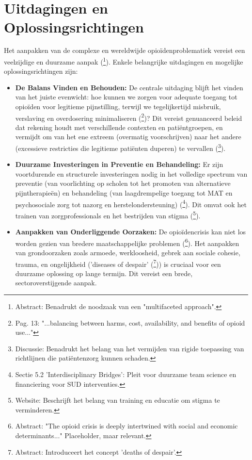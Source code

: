 \documentclass[11pt, a4paper]{report} %
\begin{document}
\section{Uitdagingen en Oplossingsrichtingen}
Het aanpakken van de complexe en wereldwijde opioïdenproblematiek vereist een veelzijdige en duurzame aanpak (\cite{Volkow2021ChangingOpioidCrisis}\footnote{Abstract: Benadrukt de noodzaak van een "multifaceted approach".}). Enkele belangrijke uitdagingen en mogelijke oplossingsrichtingen zijn:
\begin{itemize}
    \item \textbf{De Balans Vinden en Behouden:} De centrale uitdaging blijft het vinden van het juiste evenwicht: hoe kunnen we zorgen voor adequate toegang tot opioïden voor legitieme pijnstilling, terwijl we tegelijkertijd misbruik, verslaving en overdosering minimaliseren (\cite{Maclean2020EconomicStudiesOpioid}\footnote{Pag. 13: "...balancing between harms, cost, availability, and benefits of opioid use..."})? Dit vereist genuanceerd beleid dat rekening houdt met verschillende contexten en patiëntgroepen, en vermijdt om van het ene extreem (overmatig voorschrijven) naar het andere (excessieve restricties die legitieme patiënten duperen) te vervallen (\cite{Dowell2016CDCGuideline}\footnote{Discussie: Benadrukt het belang van het vermijden van rigide toepassing van richtlijnen die patiëntenzorg kunnen schaden.}).
    \item \textbf{Duurzame Investeringen in Preventie en Behandeling:} Er zijn voortdurende en structurele investeringen nodig in het volledige spectrum van preventie (van voorlichting op scholen tot het promoten van alternatieve pijntherapieën) en behandeling (van laagdrempelige toegang tot MAT en psychosociale zorg tot nazorg en herstelondersteuning) (\cite{Yarosh2020ComputationalSupportSUD}\footnote{Sectie 5.2 'Interdisciplinary Bridges': Pleit voor duurzame team science en financiering voor SUD interventies.}). Dit omvat ook het trainen van zorgprofessionals en het bestrijden van stigma (\cite{CDCStigmaReduction}\footnote{Website: Beschrijft het belang van training en educatie om stigma te verminderen.}).
    \item \textbf{Aanpakken van Onderliggende Oorzaken:} De opioïdencrisis kan niet los worden gezien van bredere maatschappelijke problemen (\cite{Dasgupta2018OpioidCrisisSocialEconomicDeterminants}\footnote{Abstract: "The opioid crisis is deeply intertwined with social and economic determinants..." Placeholder, maar relevant.}). Het aanpakken van grondoorzaken zoals armoede, werkloosheid, gebrek aan sociale cohesie, trauma, en ongelijkheid ('diseases of despair' (\cite{CaseDeaton2015RisingMorbidityMortality}\footnote{Abstract: Introduceert het concept 'deaths of despair'.})) is cruciaal voor een duurzame oplossing op lange termijn. Dit vereist een brede, sectoroverstijgende aanpak.

\end{itemize}
\end{document}
